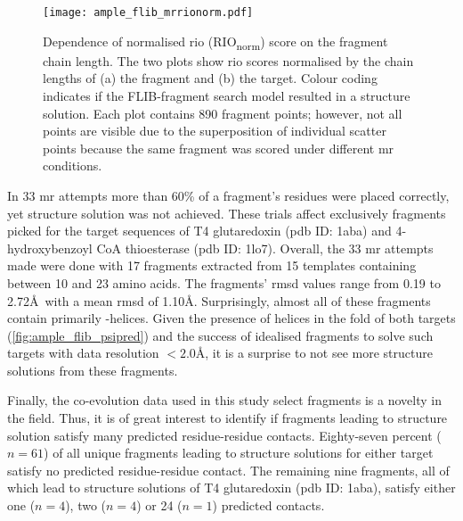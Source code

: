 \begin{figure}[H]
	\centering
	\texttt{[image: ample\_flib\_mrrionorm.pdf]}
	\caption[Relationship between fragment chain length and normalised RIO scores.]{Dependence of normalised \acrlong{rio} (RIO\textsubscript{norm}) score on the fragment chain length. The two plots show  \gls{rio} scores normalised by the chain lengths of (a) the fragment and (b) the target. Colour coding indicates if the FLIB-fragment search model resulted in a structure solution. Each plot contains 890 fragment points; however, not all points are visible due to the superposition of individual scatter points because the same fragment was scored under different \gls{mr} conditions.}
	\label{fig:ample_flib_mrrionorm}
\end{figure}

In 33 \gls{mr} attempts more than 60\% of a fragment's residues were placed correctly, yet structure solution was not achieved. These trials affect exclusively fragments picked for the target sequences of T4 glutaredoxin (\gls{pdb} ID: 1aba) and 4-hydroxybenzoyl CoA thioesterase (\gls{pdb} ID: 1lo7). Overall, the 33 \gls{mr} attempts made were done with 17 fragments extracted from 15 templates containing between 10 and 23 amino acids. The fragments' \gls{rmsd} values range from 0.19 to 2.72\AA\ with a mean \gls{rmsd} of 1.10\AA. Surprisingly, almost all of these fragments contain primarily \textalpha-helices. Given the presence of helices in the fold of both targets (\cref{fig:ample_flib_psipred}) and the success of idealised fragments to solve such targets with data resolution $<2.0$\AA, it is a surprise to not see more structure solutions from these fragments.

Finally, the co-evolution data used in this study select fragments is a novelty in the field. Thus, it is of great interest to identify if fragments leading to structure solution satisfy many predicted residue-residue contacts. Eighty-seven percent ($n=61$) of all unique fragments leading to structure solutions for either target satisfy no predicted residue-residue contact. The remaining nine fragments, all of which lead to structure solutions of T4 glutaredoxin (\gls{pdb} ID: 1aba), satisfy either one ($n=4$), two ($n=4$) or 24 ($n=1$) predicted contacts. 

